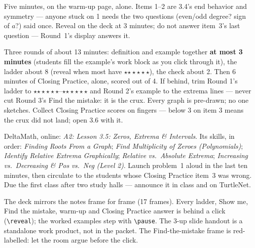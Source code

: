 \documentclass[10pt]{article}
\newcommand{\rung}[1]{{\color{goldacc}\ifcase#1\or$\star$\or$\star\star$\or$\star\star\star$\fi}}
\begin{document}
\begin{teachernote}[Warm-Up]
Five minutes, on the warm-up page, alone. Items 1--2 are 3.4's end behavior and symmetry ---
anyone stuck on 1 needs the two questions (even/odd degree? sign of $a$?) said once. Reveal on
the deck at 3 minutes; do not answer item~3's last question --- Round~1's display answers it.
\end{teachernote}

\begin{teachernote}
Three rounds of about 13 minutes: definition and example together \textbf{at most 3 minutes}
(students fill the example's work block as you click through it), the ladder about 8 (reveal
when most have \rung2), the check about 2. Then 6 minutes of Closing Practice, alone, scored out
of 4. If behind, trim Round 1's ladder to \rung1--\rung2 and Round 2's example to the extrema
lines --- never cut Round 3's Find the mistake: it is the crux. Every graph is pre-drawn; no one
sketches. Collect Closing Practice scores on fingers --- below 3 on item 3 means the crux did
not land; open 3.6 with it.
\end{teachernote}

\begin{teachernote}[Homework]
DeltaMath, online: \emph{A2: Lesson 3.5: Zeros, Extrema \& Intervals}. Its skills, in order: \emph{Finding Roots From a Graph}; \emph{Find Multiplicity of Zeroes (Polynomials)}; \emph{Identify Relative Extrema Graphically}; \emph{Relative vs.\ Absolute Extrema}; \emph{Increasing vs.\ Decreasing \& Pos vs.\ Neg (Level 2)}. Launch problem~1 aloud in the last ten
minutes, then circulate to the students whose Closing Practice item~3 was wrong. Due the first
class after two study halls --- announce it in class and on TurtleNet.
\end{teachernote}

\begin{teachernote}[Slides]
The deck mirrors the notes frame for frame (17 frames). Every ladder, Show me, Find the mistake,
warm-up and Closing Practice answer is behind a click (\verb|\reveal|); the worked examples step
with \verb|\pause|. The 3-up slide handout is a standalone work product, not in the packet. The
Find-the-mistake frame is red-labelled: let the room argue before the click.
\end{teachernote}
\end{document}

